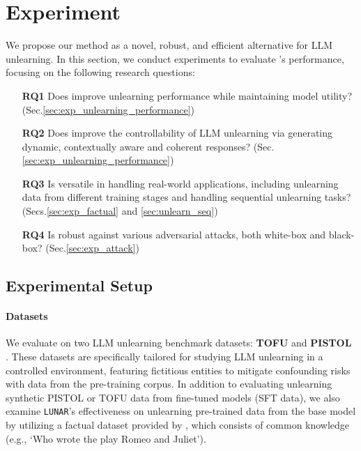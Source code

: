 \vspace{-2mm}
\section{Experiment} \label{sec:exp}
We propose our method as a novel, robust, and efficient alternative for LLM unlearning. In this section, we conduct experiments to evaluate \lunar's performance, focusing on the following research questions:

\begin{itemize}[noitemsep,topsep=0pt,parsep=2pt,partopsep=0pt]
    \item[\textbf{RQ1}] Does \lunar improve unlearning performance while maintaining model utility? (Sec.\ref{sec:exp_unlearning_performance})
    \item[\textbf{RQ2}] Does \lunar improve the controllability of LLM unlearning via 
    generating dynamic, contextually aware and coherent responses? (Sec.\ref{sec:exp_unlearning_performance})
    \item[\textbf{RQ3}] Is \lunar versatile in handling real-world applications, including unlearning data from different training stages and handling sequential unlearning tasks? (Secs.\ref{sec:exp_factual} and \ref{sec:unlearn_seq})
    \item[\textbf{RQ4}] Is \lunar robust against various adversarial attacks, both white-box and black-box? (Sec.\ref{sec:exp_attack})
\end{itemize}

\subsection{Experimental Setup} \label{sec:exp_setup}

\paragraph{Datasets} We evaluate \lunar on two LLM unlearning benchmark datasets: \textbf{TOFU} \citep{tofu} and \textbf{PISTOL} \citep{qiu2024pistol}. These datasets are specifically tailored for studying LLM unlearning in a controlled environment, featuring fictitious entities to mitigate confounding risks with data from the pre-training corpus. In addition to evaluating unlearning synthetic PISTOL or TOFU data from fine-tuned models (SFT data), we also examine \texttt{LUNAR}’s effectiveness on unlearning pre-trained data from the base model by utilizing a factual dataset provided by \citep{tofu}, which consists of common knowledge (e.g., `Who wrote the play Romeo and Juliet').

